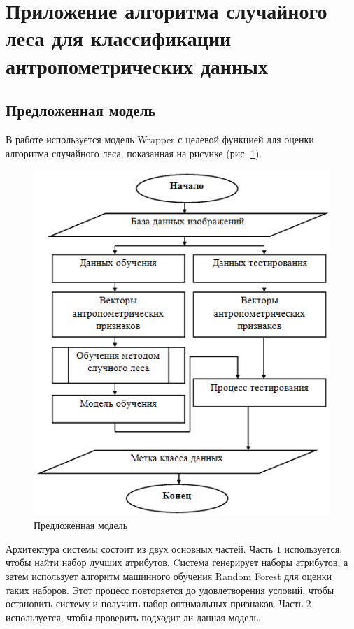 \section{Приложение алгоритма случайного леса для классификации антропометрических данных}
\subsection{Предложенная модель} В работе используется модель Wrapper \cite{Vladimir2000} с целевой функцией для оценки алгоритма случайного леса, показанная на рисунке (рис. \ref{img19}).
\begin{figure}[ht!]
\centering
\includegraphics [scale=1] {images/h19.png}
\begin{center}
\caption{Предложенная модель} \label{img19}
\end{center}
\end{figure}
Архитектура системы состоит из двух основных частей. Часть $1$ используется, чтобы найти набор лучших атрибутов. Cистема генерирует наборы атрибутов, а затем использует алгоритм машинного обучения Random Forest для оценки таких наборов. Этот процесс повторяется до удовлетворения условий, чтобы остановить систему и получить набор оптимальных признаков. Часть $2$ используется, чтобы проверить подходит ли данная модель.
